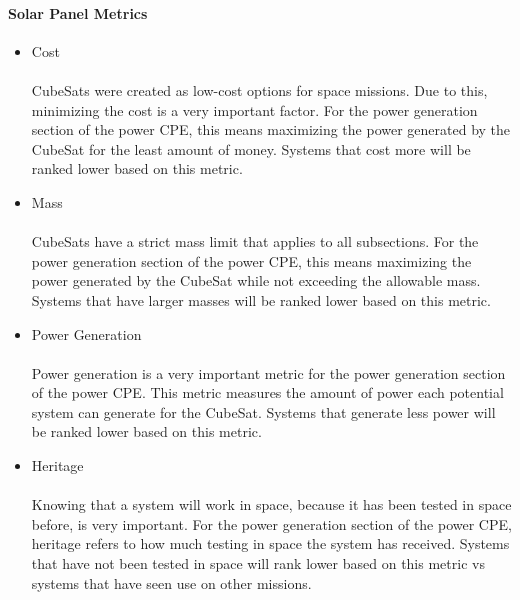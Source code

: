 \documentclass{ece}
\begin{document}
\paragraph{Solar Panel Metrics}
\begin{itemize}
\item Cost\\
\\
CubeSats were created as low-cost options for space missions.  Due to this, minimizing the cost is a very important factor.  For the power generation section of the power CPE,  this means maximizing the power generated by the CubeSat for the least amount of money.  Systems that cost more will be ranked lower based on this metric.
\item{Mass} \\
\\
CubeSats have a strict mass limit that applies to all subsections.  For the power generation section of the power CPE, this means maximizing the power generated by the CubeSat while not exceeding the allowable mass.  Systems that have larger masses will be ranked lower based on this metric.
\item{Power Generation} \\
\\
Power generation is a very important metric for the power generation section of the power CPE.  This metric measures the amount of power each potential system can generate for the CubeSat.  Systems that generate less power will be ranked lower based on this metric.
\item{Heritage} \\
\\
Knowing that a system will work in space, because it has been tested in space before, is very important. For the power generation section of the power CPE, heritage refers to how much testing in space the system has received.  Systems that have not been tested in space will rank lower based on this metric vs systems that have seen use on other missions.
\end{itemize}
\end{document}
